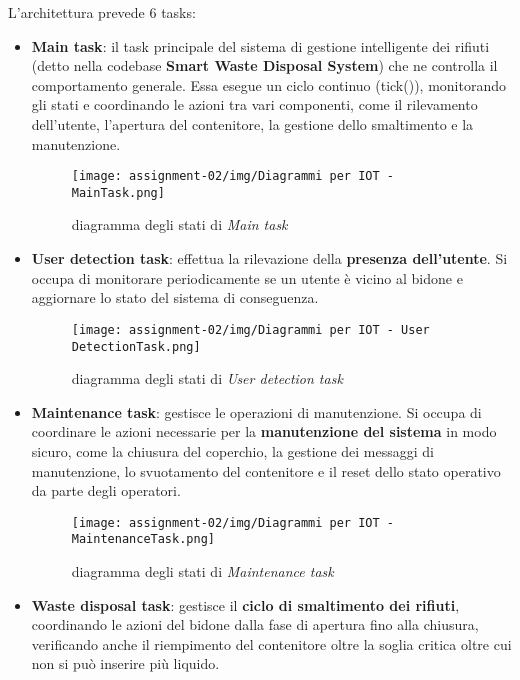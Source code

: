 \documentclass{report}
\begin{document}
\par{
L'architettura prevede 6 tasks: 
}
\begin{itemize}
    \item {
    \textbf{Main task}: il task principale del sistema di gestione intelligente dei rifiuti (detto nella codebase \textbf{Smart Waste Disposal System}) che ne controlla il comportamento generale. Essa esegue un ciclo continuo (tick()), monitorando gli stati e coordinando le azioni tra vari componenti, come il rilevamento dell'utente, l'apertura del contenitore, la gestione dello smaltimento e la manutenzione.
    \begin{figure}[H]
        \centering
        \texttt{[image: assignment-02/img/Diagrammi per IOT - MainTask.png]}
        \caption{diagramma degli stati di \textit{Main task}}
        \label{fig:main-task}
    \end{figure}
    }
    \item {
    \textbf{User detection task}: effettua la rilevazione della \textbf{presenza dell'utente}. Si occupa di monitorare periodicamente se un utente è vicino al bidone e aggiornare lo stato del sistema di conseguenza.
    \begin{figure}[H]
        \centering
        \texttt{[image: assignment-02/img/Diagrammi per IOT - User DetectionTask.png]}
        \caption{diagramma degli stati di \textit{User detection task}}
        \label{fig:detection-task}
    \end{figure}
    }
    \item {
    \textbf{Maintenance task}: gestisce le operazioni di manutenzione. Si occupa di coordinare le azioni necessarie per la \textbf{manutenzione del sistema} in modo sicuro, come la chiusura del coperchio, la gestione dei messaggi di manutenzione, lo svuotamento del contenitore e il reset dello stato operativo da parte degli operatori.
    \begin{figure}[H]
        \centering
        \texttt{[image: assignment-02/img/Diagrammi per IOT - MaintenanceTask.png]}
        \caption{diagramma degli stati di \textit{Maintenance task}}
        \label{fig:maintenance-task}
    \end{figure}
    }
    \item {
    \textbf{Waste disposal task}: gestisce il \textbf{ciclo di smaltimento dei rifiuti}, coordinando le azioni del bidone dalla fase di apertura fino alla chiusura, verificando anche il riempimento del contenitore oltre la soglia critica oltre cui non si può inserire più liquido.
}
\end{itemize}
\end{document}
